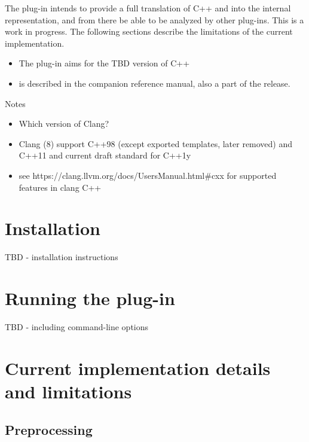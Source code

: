 The \fclang plug-in intends to provide a full translation of C++ and \acslpp into the \framac internal representation, and from there be able to be analyzed by other \framac plug-ins. 
This is a work in progress. 
The following sections describe the  limitations of the current implementation.
\begin{itemize}
	\item The plug-in aims for the TBD version of C++
	\item \acslpp is described in the companion \acslpp reference manual, also a part of the \framac release.
\end{itemize}


Notes
\begin{itemize}
	\item Which version of Clang?
	\item Clang (8) support C++98 (except exported templates, later removed) and C++11 and current draft standard for C++1y 
	\item see https://clang.llvm.org/docs/UsersManual.html\#cxx for supported features in clang C++
\end{itemize}

\chapter{Installation}

TBD - installation instructions

\chapter{Running the plug-in}

TBD - including command-line options

\chapter{Current implementation details and limitations}

\section{Preprocessing}

